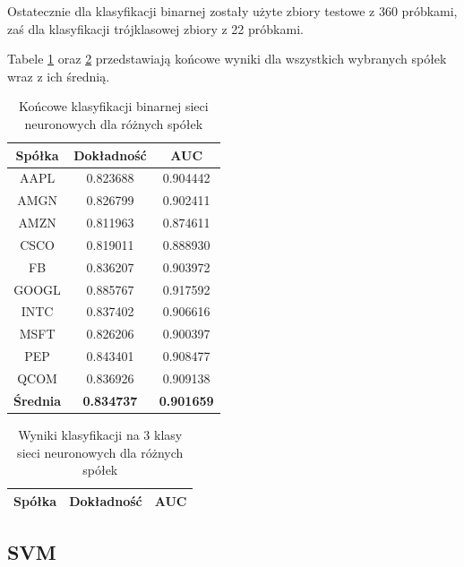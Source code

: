 \documentclass[a4paper, twoside, 11pt, openright]{article}
\begin{document}
Ostatecznie dla klasyfikacji binarnej zostały użyte zbiory testowe z 360 próbkami, zaś dla klasyfikacji trójklasowej zbiory z 22 próbkami.

\bigskip

Tabele \ref{tab:nn_final_binary} oraz \ref{tab:nn_final_discrete} przedstawiają końcowe wyniki dla wszystkich wybranych spółek wraz z ich średnią. 

\begin{table}[H]
    \centering
    \begin{tabular}{|c|c|c|}
    \hline
        \textbf{Spółka} & \textbf{Dokładność} &  \textbf{AUC} \\ \hline
AAPL   &  0.823688 &  0.904442 \\ \hline
AMGN   &  0.826799 &  0.902411 \\ \hline
AMZN   &  0.811963 &  0.874611 \\ \hline
CSCO   &  0.819011 &  0.888930 \\ \hline
FB     &  0.836207 &  0.903972 \\ \hline
GOOGL  &  0.885767 &  0.917592 \\ \hline
INTC   &  0.837402 &  0.906616 \\ \hline
MSFT   &  0.826206 &  0.900397 \\ \hline
PEP    &  0.843401 &  0.908477 \\ \hline
QCOM   &  0.836926 &  0.909138 \\ \hline \hline
\textbf{Średnia} &  \textbf{0.834737} & \textbf{0.901659} \\  \hline
    \end{tabular}
    \caption{Końcowe klasyfikacji binarnej sieci neuronowych dla różnych spółek}
    \label{tab:nn_final_binary}
\end{table}

\begin{table}[H]
    \centering
    \begin{tabular}{|c|c|c|}
    \hline
        \textbf{Spółka} & \textbf{Dokładność} &  \textbf{AUC} \\ \hline

    \end{tabular}
    \caption{Wyniki klasyfikacji na 3 klasy sieci neuronowych dla różnych spółek}
    \label{tab:nn_final_discrete}
\end{table}

\subsection{SVM}
\end{document}
